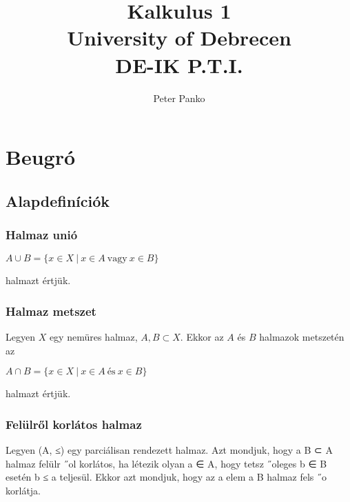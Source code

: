 \documentclass[12pt]{article}
\title{\Huge Kalkulus 1 \\
\LARGE University of Debrecen \\
\large DE-IK P.T.I.}
\author{Peter Panko}
\begin{document}
\clearpage\maketitle
\thispagestyle{empty}
\newpage


\tableofcontents 

\newpage




\section{Beugró}


\subsection{Alapdefiníciók}

\subsubsection{Halmaz unió}

\begin{center}
$A \cup B = \{x \in X\ |\ x \in A\ \text{vagy}\ x \in B\}$
\end{center}
halmazt értjük.

\subsubsection{Halmaz metszet}

Legyen $X$ egy nemüres halmaz, $A, B \subset X$. Ekkor az $A$ és $B$ halmazok metszetén az
\begin{center}
$A \cap B = \{x \in X\ |\ x \in A\ \text{és}\ x \in B\}$
\end{center}
halmazt értjük.




\subsubsection{Felülről korlátos halmaz}

Legyen (A, ≤) egy parciálisan rendezett halmaz. Azt mondjuk, hogy a B ⊂ A halmaz
felülr ˝ol korlátos, ha létezik olyan a ∈ A, hogy tetsz ˝oleges b ∈ B esetén b ≤ a teljesül. Ekkor azt mondjuk,
hogy az a elem a B halmaz fels ˝o korlátja.
\end{document}
